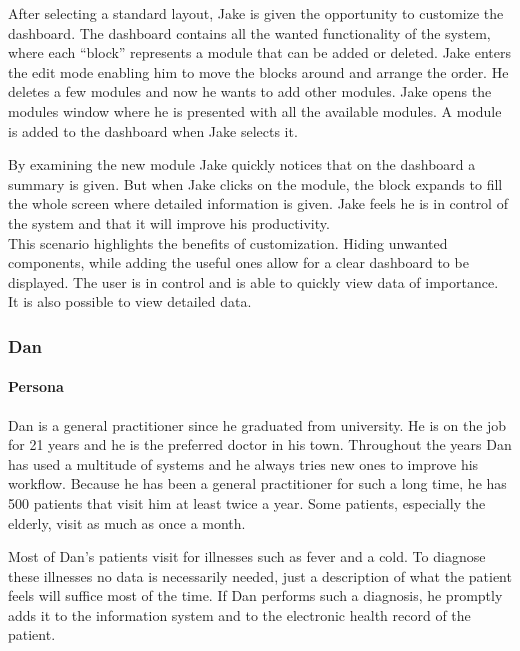         After selecting a standard layout, Jake is given the opportunity to customize the dashboard. The dashboard contains all the wanted functionality of the system, where each ``block'' represents a module that can be added or deleted. Jake enters the edit mode enabling him to move the blocks around and arrange the order. He deletes a few modules and now he wants to add other modules. Jake opens the modules window where he is presented with all the available modules. A module is added to the dashboard when Jake selects it.

        By examining the new module Jake quickly notices that on the dashboard a summary is given. But when Jake clicks on the module, the block expands to fill the whole screen where detailed information is given. Jake feels he is in control of the system and that it will improve his productivity.\\

        \noindent This scenario highlights the benefits of customization. Hiding unwanted components, while adding the useful ones allow for a clear dashboard to be displayed. The user is in control and is able to quickly view data of importance. It is also possible to view detailed data.
        
        \subsubsection{Dan}

        \paragraph{Persona} Dan is a general practitioner since he graduated from university. He is on the job for 21 years and he is the preferred doctor in his town. Throughout the years Dan has used a multitude of systems and he always tries new ones to improve his workflow. Because he has been a general practitioner for such a long time, he has 500 patients that visit him at least twice a year. Some patients, especially the elderly, visit as much as once a month.

        Most of Dan's patients visit for illnesses such as fever and a cold. To diagnose these illnesses no data is necessarily needed, just a description of what the patient feels will suffice most of the time. If Dan performs such a diagnosis, he promptly adds it to the information system and to the electronic health record of the patient.

